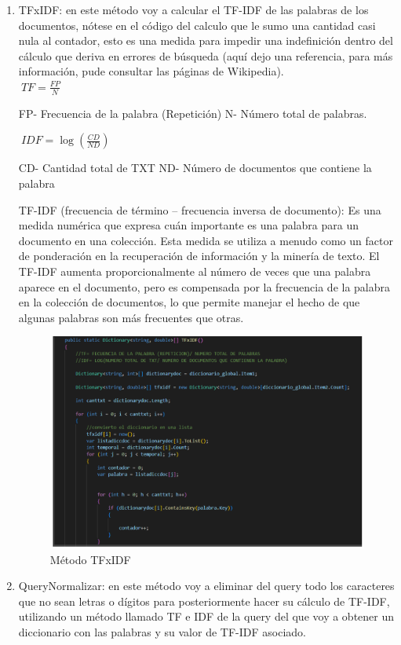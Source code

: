 \documentclass[a4paper,12pt]{article}
\begin{document}
\begin{enumerate}
		\item TFxIDF: en este método voy a calcular el TF-IDF de las palabras de los documentos, nótese en el código del calculo que le sumo una cantidad casi nula al contador, esto es una medida para impedir una indefinición dentro del cálculo que deriva en errores de búsqueda (aquí dejo una referencia, para más información, pude consultar las páginas de Wikipedia).\\
		
		$\ TF = \frac{FP}{N} $
		
		FP- Frecuencia de la palabra (Repetición)
		N- Número total de palabras.
		
		$\ IDF = \log\left(\frac{CD}{ND}\right) $
		
		CD- Cantidad total de TXT
		ND- Número de documentos que contiene la palabra
		
		
		TF-IDF (frecuencia de término – frecuencia inversa de documento): Es una medida numérica que expresa cuán importante es una palabra para un documento en una colección. Esta medida se utiliza a menudo como un factor de ponderación en la recuperación de información y la minería de texto. El TF-IDF aumenta proporcionalmente al número de veces que una palabra aparece en el documento, pero es compensada por la frecuencia de la palabra en la colección de documentos, lo que permite manejar el hecho de que algunas palabras son más frecuentes que otras.\\
		\newpage
		\begin{figure}[h]
			\centering
			\includegraphics[width=13cm]{figura3.png}
			\caption{Método TFxIDF}
		\end{figure}
		
		\item QueryNormalizar: en este método voy a eliminar del query todo los caracteres que no sean letras o dígitos para posteriormente hacer su cálculo de TF-IDF, utilizando un método llamado TF e IDF de la query  del que voy a obtener un diccionario con las palabras y su valor de TF-IDF asociado.\\
		

\end{enumerate}
\end{document}
